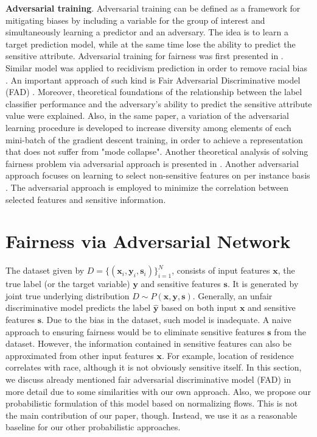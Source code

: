 \documentclass[preprint,12pt]{elsarticle}
\begin{document}
\textbf{Adversarial training}. Adversarial training can be defined as a framework for mitigating biases by including a variable for the group of interest and simultaneously learning a predictor and an adversary. The idea is to learn a target prediction model, while at the same time lose the ability to predict the sensitive attribute.
Adversarial training for fairness was first presented in \cite{zhang2018mitigating}. Similar model was applied to recidivism prediction in order to remove racial bias \cite{wadsworth2018achieving}.
An important approach of such kind is Fair Adversarial Discriminative model (FAD) \cite{adel2019one}. Moreover, theoretical foundations of the relationship between the label classifier performance and the adversary’s ability to predict the sensitive attribute value were explained. Also, in the same paper, a variation of the adversarial learning procedure is developed to increase diversity among elements of each mini-batch of the gradient descent training, in order to achieve a representation that does not suffer from "mode collapse".
Another theoretical analysis of solving fairness problem via adversarial approach is presented in \cite{madras2018learning}.
Another adversarial approach focuses on learning to select non-sensitive features on per instance basis \cite{wang2019approaching}. The adversarial approach is employed to minimize the correlation between selected features and sensitive information.



\section{Fairness via Adversarial Network}
\label{Sec:advnet}
The dataset given by $D= \{(\mathbf{x}_i, \mathbf{y}_i, \mathbf{s}_i) \}_{i=1}^N$, consists of input features $\mathbf{x}$, the true label (or the target variable) $\mathbf{y}$ and sensitive features $\mathbf{s}$. It is generated by joint true underlying distribution $D \sim P(\mathbf{x},\mathbf{y},\mathbf{s})$. Generally, an unfair discriminative model predicts the label $\mathbf{\hat{y}}$ based on both input $\mathbf{x}$ and sensitive  features $\mathbf{s}$. Due to the bias in the dataset, such model is inadequate. A naive approach to ensuring fairness would be to eliminate sensitive features $\mathbf{s}$ from the dataset. However, the information contained in sensitive features can also be approximated from other input features $\mathbf{x}$. For example, location of residence correlates with race, although it is not obviously sensitive itself. In this section, we discuss already mentioned fair adversarial discriminative model (FAD) in more detail due to some similarities with our own approach. Also, we propose our probabilistic formulation of this model based on normalizing flows. This is not the main contribution of our paper, though. Instead, we use it as a reasonable baseline for our other probabilistic approaches.
\end{document}
